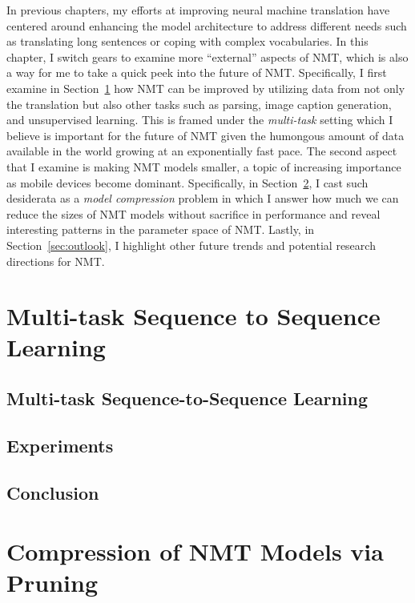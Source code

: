 In previous chapters, my efforts at improving neural machine
translation have centered around enhancing the model architecture to address
different needs such as translating long sentences or coping with
complex vocabularies. In this chapter, I switch gears to examine more ``external''
aspects of NMT, which is also a way for me to take a quick peek into the future of NMT.
Specifically, I first examine in Section~\ref{sec:multi-task} how NMT can be improved by utilizing data from
not only the translation but also other tasks such as parsing, image caption
generation, and unsupervised learning. This is framed under the {\it multi-task}
setting which I believe is important for the future of NMT given the humongous amount of
data available in the world growing at an exponentially fast pace. The second
aspect that I examine is making NMT models smaller, a topic of 
increasing importance as mobile devices become dominant. Specifically, in
Section~\ref{sec:nmt-compression}, I cast such
desiderata as a {\it model compression} problem in which I answer how much we can
reduce the sizes of NMT models without sacrifice in performance and reveal
interesting patterns in the parameter space of NMT. Lastly, in
Section~\ref{sec:outlook}, I highlight other future trends and potential
research directions for NMT.


\section{Multi-task Sequence to Sequence Learning}
\label{sec:multi-task}


\subsection{Multi-task Sequence-to-Sequence Learning}
\label{subsec:multi}


\subsection{Experiments}
\label{sec:6_1_exp}


\subsection{Conclusion}
\label{sec:conclude}


\section{Compression of NMT Models via Pruning}
\label{sec:nmt-compression}



